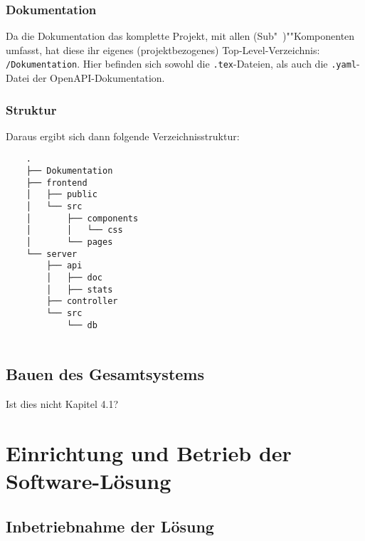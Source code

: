 \documentclass[a4paper,11pt,DIV=12,overfullrule=on]{scrreprt}%
\begin{document}
\subsection{Dokumentation}
Da die Dokumentation das komplette Projekt, mit allen (Sub"~)""Komponenten umfasst, hat diese ihr eigenes (projektbezogenes) Top-Level-Verzeichnis: \texttt{/Dokumentation}. Hier befinden sich sowohl die \texttt{.tex}-Dateien, als auch die \texttt{.yaml}-Datei der OpenAPI-Dokumentation.
\subsection{Struktur}
Daraus ergibt sich dann folgende Verzeichnisstruktur:
\begin{verbatim}
    .
    ├── Dokumentation
    ├── frontend
    │   ├── public
    │   └── src
    │       ├── components
    │       │   └── css
    │       └── pages
    └── server
        ├── api
        │   ├── doc
        │   ├── stats
        ├── controller
        └── src
            └── db
    
\end{verbatim}

\section{Bauen des Gesamtsystems}
Ist dies nicht Kapitel 4.1?


\chapter{Einrichtung und Betrieb der Software-Lösung}
\section{Inbetriebnahme der Lösung}
\end{document}
